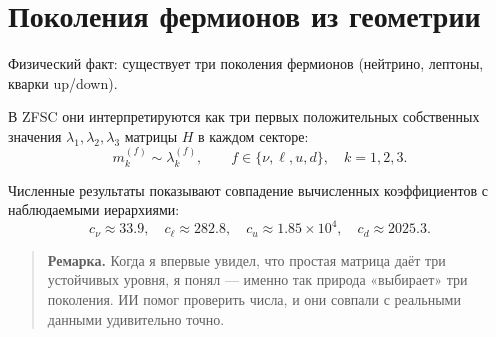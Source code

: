 \documentclass[12pt,a4paper]{article}
\begin{document}
\section{Поколения фермионов из геометрии}
Физический факт: существует три поколения фермионов (нейтрино, лептоны, кварки up/down).  

В ZFSC они интерпретируются как три первых положительных собственных значения $\lambda_1,\lambda_2,\lambda_3$ матрицы $H$ в каждом секторе:
\[
m^{(f)}_k \sim \lambda^{(f)}_k, \qquad f \in \{\nu,\ell,u,d\}, \quad k=1,2,3.
\]

Численные результаты показывают совпадение вычисленных коэффициентов с наблюдаемыми иерархиями:
\[
c_\nu \approx 33.9, \quad
c_\ell \approx 282.8, \quad
c_u \approx 1.85 \times 10^4, \quad
c_d \approx 2025.3.
\]

\begin{quote}
\textbf{Ремарка.}  
Когда я впервые увидел, что простая матрица даёт три устойчивых уровня, я понял — именно так природа «выбирает» три поколения. 
ИИ помог проверить числа, и они совпали с реальными данными удивительно точно.
\end{quote}
\end{document}
